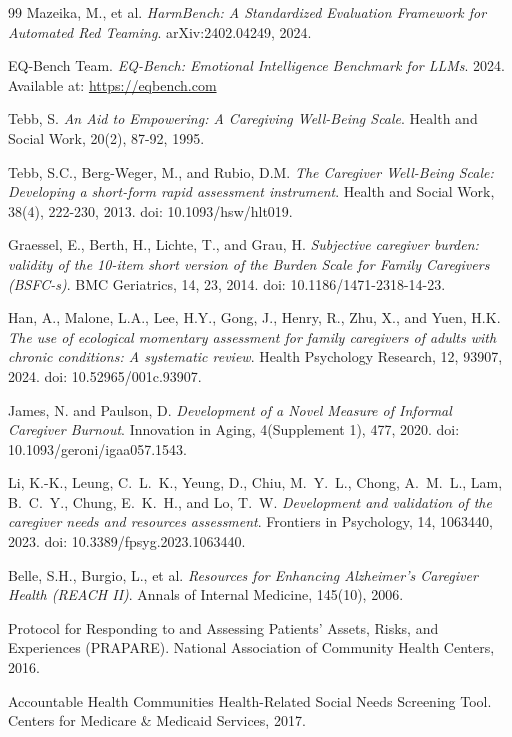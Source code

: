 \documentclass{article}
\begin{document}
\begin{thebibliography}{99}
Mazeika, M., et al.
\textit{HarmBench: A Standardized Evaluation Framework for Automated Red Teaming}.
arXiv:2402.04249, 2024.

EQ-Bench Team.
\textit{EQ-Bench: Emotional Intelligence Benchmark for LLMs}.
2024. Available at: \url{https://eqbench.com}

Tebb, S.
\textit{An Aid to Empowering: A Caregiving Well-Being Scale}.
Health and Social Work, 20(2), 87-92, 1995.

Tebb, S.C., Berg-Weger, M., and Rubio, D.M.
\textit{The Caregiver Well-Being Scale: Developing a short-form rapid assessment instrument}.
Health and Social Work, 38(4), 222-230, 2013.
doi: 10.1093/hsw/hlt019.

Graessel, E., Berth, H., Lichte, T., and Grau, H.
\textit{Subjective caregiver burden: validity of the 10-item short version of the Burden Scale for Family Caregivers (BSFC-s)}.
BMC Geriatrics, 14, 23, 2014.
doi: 10.1186/1471-2318-14-23.

Han, A., Malone, L.A., Lee, H.Y., Gong, J., Henry, R., Zhu, X., and Yuen, H.K.
\textit{The use of ecological momentary assessment for family caregivers of adults with chronic conditions: A systematic review}.
Health Psychology Research, 12, 93907, 2024.
doi: 10.52965/001c.93907.

James, N. and Paulson, D.
\textit{Development of a Novel Measure of Informal Caregiver Burnout}.
Innovation in Aging, 4(Supplement 1), 477, 2020.
doi: 10.1093/geroni/igaa057.1543.

Li, K.-K., Leung, C.~L.~K., Yeung, D., Chiu, M.~Y.~L., Chong, A.~M.~L., Lam, B.~C.~Y., Chung, E.~K.~H., and Lo, T.~W.
\textit{Development and validation of the caregiver needs and resources assessment}.
Frontiers in Psychology, 14, 1063440, 2023.
doi: 10.3389/fpsyg.2023.1063440.

Belle, S.H., Burgio, L., et al.
\textit{Resources for Enhancing Alzheimer's Caregiver Health (REACH II)}.
Annals of Internal Medicine, 145(10), 2006.

Protocol for Responding to and Assessing Patients' Assets, Risks, and Experiences (PRAPARE).
National Association of Community Health Centers, 2016.

Accountable Health Communities Health-Related Social Needs Screening Tool.
Centers for Medicare \& Medicaid Services, 2017.


\end{thebibliography}
\end{document}
